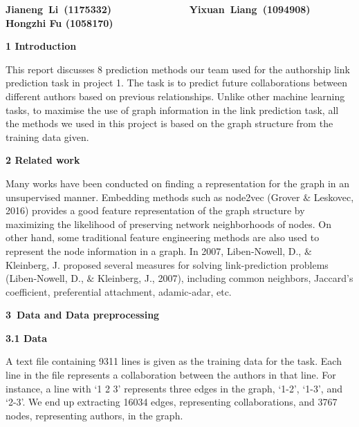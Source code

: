 \documentclass[12pt]{article}
\renewcommand{\_}{\kern-1.5pt\textunderscore\kern-1.5pt}
\begin{document}
\setlength{\parskip}{3.0pt}
\begin{adjustwidth}{0.29in}{0.0in}
\begin{Center}
{\fontsize{10pt}{12.0pt}\selectfont \textbf{Jianeng\ Li\ (1175332)\ \ \ \ \ \ \ \ \ \ \ \ \ \ Yixuan\ Liang\ (1094908)\ \ \ \ \ \ \       Hongzhi Fu (1058170)}\par}
\end{Center}
\end{adjustwidth}

\setlength{\parskip}{6.0pt}
\begin{justify}
{\fontsize{13pt}{15.6pt}\selectfont \textbf{1 Introduction}}
\end{justify}
\begin{justify}
This report discusses 8 prediction methods our team used for the authorship link prediction task in project 1. The task is to predict future collaborations between different authors based on previous relationships. Unlike other machine learning tasks, to maximise the use of graph information in the link prediction task, all the methods we used in this project is based on the graph structure from the training data given. 
\end{justify}
\begin{justify}
{\fontsize{13pt}{15.6pt}\selectfont \textbf{2 Related work }}
\end{justify}
\begin{justify}
Many works have been conducted on finding a representation for the graph in an unsupervised manner. Embedding methods such as node2vec (Grover $\&$  Leskovec, 2016) provides a good feature representation of the graph structure by maximizing the likelihood of preserving network neighborhoods of nodes. On other hand, some traditional feature engineering methods are also used to represent the node information in a graph. In 2007, Liben‐Nowell, D., $\&$  Kleinberg, J.\textcolor[HTML]{222222}{ proposed several measures for solving link-prediction problems (}Liben‐Nowell, D., $\&$  Kleinberg, J., 2007\textcolor[HTML]{222222}{), including common neighbors, Jaccard’s coefficient, preferential attachment, adamic-adar, etc.}
\end{justify}
\begin{justify}
{\fontsize{13pt}{15.6pt}\selectfont \textbf{3 Data and Data preprocessing}}
\end{justify}
\setlength{\parskip}{3.0pt}
\begin{justify}
\textbf{3.1 Data}
\end{justify}
\begin{justify}
A text file containing 9311 lines is given as the training data for the task. Each line in the file represents a collaboration between the authors in that line. For instance, a line with ‘1 2 3’ represents three edges in the graph, ‘1-2’, ‘1-3’, and ‘2-3’. We end up extracting 16034 edges, representing collaborations, and 3767 nodes, representing authors, in the graph. 
\end{justify}
\end{document}
